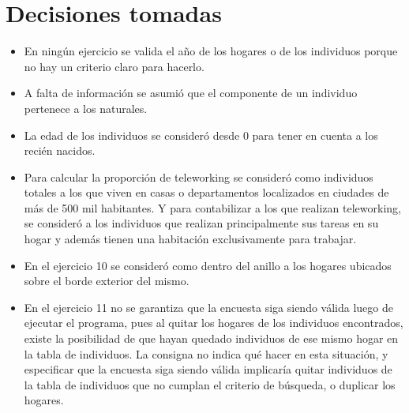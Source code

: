 \section{Decisiones tomadas}

\begin{itemize}
    \item En ningún ejercicio se valida el año de los hogares o de los individuos porque no hay un criterio claro para hacerlo.

    \item A falta de información se asumió que el componente de un individuo pertenece a los naturales.
    
    \item La edad de los individuos se consideró desde 0 para tener en cuenta a los recién nacidos.
    
    \item Para calcular la proporción de teleworking se consideró como individuos totales a los que viven en casas o departamentos localizados en ciudades de más de 500 mil habitantes. Y para contabilizar a los que realizan teleworking, se consideró a los individuos que realizan principalmente sus tareas en su hogar y además tienen una habitación exclusivamente para trabajar.
    
    \item En el ejercicio 10 se consideró como dentro del anillo a los hogares ubicados sobre el borde exterior del mismo.
    
    \item En el ejercicio 11 no se garantiza que la encuesta siga siendo válida luego de ejecutar el programa, pues al quitar los hogares de los individuos encontrados, existe la posibilidad de que hayan quedado individuos de ese mismo hogar en la tabla de individuos. La consigna no indica qué hacer en esta situación, y especificar que la encuesta siga siendo válida implicaría quitar individuos de la tabla de individuos que no cumplan el criterio de búsqueda, o duplicar los hogares.
\end{itemize}

